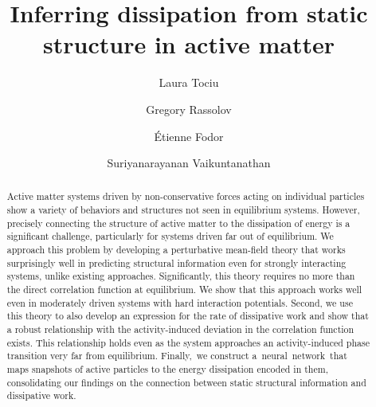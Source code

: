 \documentclass[superscriptaddress, twocolumn, prl, longbibliography, nofootinbib]{revtex4-1}
\begin{document}
 
\title{Inferring dissipation from static structure in active matter}

\author{Laura Tociu}
\author{Gregory Rassolov}

\author{\'Etienne Fodor}

\author{Suriyanarayanan Vaikuntanathan}

\begin{abstract}
Active matter systems driven by non-conservative forces acting on individual particles show a variety of behaviors and structures not seen in equilibrium systems. However, precisely connecting the structure of active matter to the dissipation of energy is a significant challenge, particularly for systems driven far out of equilibrium. We approach this problem by developing a perturbative mean-field theory that works surprisingly well in predicting structural information even for strongly interacting systems, unlike existing approaches. Significantly, this theory requires no more than the direct correlation function at equilibrium. We show that this approach works well even in moderately driven systems with hard interaction potentials. Second, we use this theory to also develop an expression for the rate of dissipative work and show that a robust relationship with the activity-induced deviation in the correlation function exists. This relationship holds even as the system approaches an activity-induced phase transition very far from equilibrium. Finally, we construct a neural network that maps snapshots of active particles to the energy dissipation encoded in them, consolidating our findings on the connection between static structural information and dissipative work.

\end{abstract}

\maketitle
\end{document}
